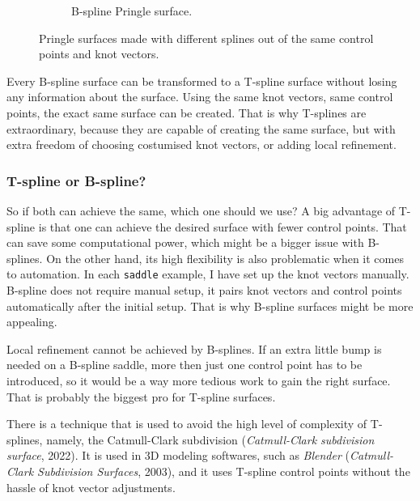 \documentclass{article}
\begin{document}
\begin{figure}[H]
\begin{subfigure}[b]{0.48\textwidth}
\caption{B-spline Pringle surface.}
\label{pringleb}
\end{subfigure}
\caption{Pringle surfaces made with different splines out of the same control points and knot vectors.}
\label{pringle}
\end{figure}

Every B-spline surface can be transformed to a T-spline surface without losing any information about the surface. Using the same knot vectors, same control points, the exact same surface can be created. That is why T-splines are extraordinary, because they are capable of creating the same surface, but with extra freedom of choosing costumised knot vectors, or adding local refinement.

\subsubsection{T-spline or B-spline?}

\vspace{6pt}

So if both can achieve the same, which one should we use? A big advantage of T-spline is that one can achieve the desired surface with fewer control points. That can save some computational power, which might be a bigger issue with B-splines. On the other hand, its high flexibility is also problematic when it comes to automation. In each \texttt{saddle} example, I have set up the knot vectors manually. B-spline does not require manual setup, it pairs knot vectors and control points automatically after the initial setup. That is why B-spline surfaces might be more appealing.

Local refinement cannot be achieved by B-splines. If an extra little bump is needed on a B-spline saddle, more then just one control point has to be introduced, so it would be a way more tedious work to gain the right surface. That is probably the biggest pro for T-spline surfaces.

\vspace{6pt}

There is a technique that is used to avoid the high level of complexity of T-splines, namely, the Catmull-Clark subdivision (\emph{Catmull-Clark subdivision surface}, 2022). It is used in 3D modeling softwares, such as \emph{Blender} (\emph{Catmull-Clark Subdivision Surfaces}, 2003), and it uses T-spline control points without the hassle of knot vector adjustments.


\vspace{12pt}
\end{document}
